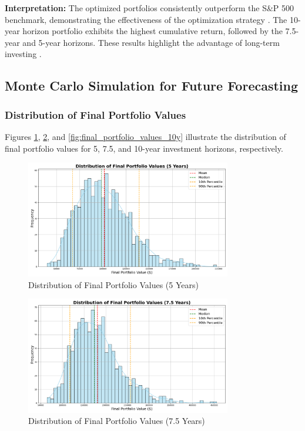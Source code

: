 \textbf{Interpretation:} The optimized portfolios consistently outperform the S\&P 500 benchmark, demonstrating the effectiveness of the optimization strategy \citep{sharpe1966mutual}. The 10-year horizon portfolio exhibits the highest cumulative return, followed by the 7.5-year and 5-year horizons. These results highlight the advantage of long-term investing \citep{fama1970efficient}.

\subsection{Monte Carlo Simulation for Future Forecasting}

\subsubsection{Distribution of Final Portfolio Values}
Figures \ref{fig:final_portfolio_values_5y}, \ref{fig:final_portfolio_values_7_5y}, and \ref{fig:final_portfolio_values_10y} illustrate the distribution of final portfolio values for 5, 7.5, and 10-year investment horizons, respectively.

\begin{figure}[!htbp]
    \centering
    \includegraphics[width=0.8\textwidth]{../Figures/final_portfolio_values_distribution_5_years.png}
    \caption{Distribution of Final Portfolio Values (5 Years)}
    \label{fig:final_portfolio_values_5y}
\end{figure}

\begin{figure}[!htbp]
    \centering
    \includegraphics[width=0.8\textwidth]{../Figures/final_portfolio_values_distribution_7_5_years.png}
    \caption{Distribution of Final Portfolio Values (7.5 Years)}
    \label{fig:final_portfolio_values_7_5y}
\end{figure}

